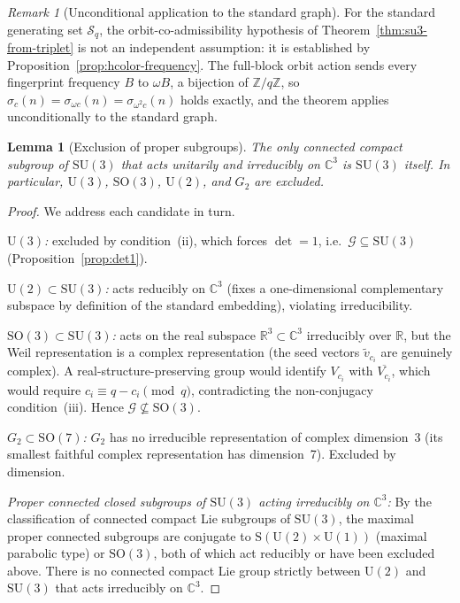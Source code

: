 \documentclass[11pt,a4paper]{article}
\newtheorem{lemma}[theorem]{Lemma}
\theoremstyle{definition}
\theoremstyle{remark}
\newtheorem{remark}[theorem]{Remark}
\newcommand{\SU}{\mathrm{SU}}
\newcommand{\Z}{\mathbb{Z}}
\newcommand{\C}{\mathbb{C}}
\newcommand{\R}{\mathbb{R}}
\newcommand{\Sq}{\mathcal{S}_q}
\begin{document}
      \begin{remark}[Unconditional application to the standard graph]
        \label{rmk:su3-unconditional}
        For the standard generating set $\Sq$, the orbit-co-admissibility hypothesis of
        Theorem~\ref{thm:su3-from-triplet} is not an independent assumption: it is established by
        Proposition~\ref{prop:hcolor-frequency}.
        The full-block orbit action sends every fingerprint frequency $B$ to $\omega B$, a bijection
        of $\Z/q\Z$, so $\sigma_c(n) = \sigma_{\omega c}(n) = \sigma_{\omega^2 c}(n)$ holds exactly,
        and the theorem applies unconditionally to the standard graph.
      \end{remark}

      \begin{lemma}[Exclusion of proper subgroups]
        \label{lem:exclusion}
        The only connected compact subgroup of $\SU(3)$ that acts unitarily and irreducibly on $\C^3$
        is $\SU(3)$ itself.
        In particular, $\mathrm{U}(3)$, $\mathrm{SO}(3)$, $\mathrm{U}(2)$, and $G_2$ are excluded.
      \end{lemma}

      \begin{proof}
        We address each candidate in turn.

        \emph{$\mathrm{U}(3)$:} excluded by condition~(ii), which forces $\det = 1$, i.e.\
        $\mathcal{G} \subseteq \mathrm{SU}(3)$ (Proposition~\ref{prop:det1}).

        \emph{$\mathrm{U}(2) \subset \SU(3)$:} acts reducibly on $\C^3$ (fixes a one-dimensional
        complementary subspace by definition of the standard embedding), violating irreducibility.

        \emph{$\mathrm{SO}(3) \subset \SU(3)$:} acts on the real subspace $\R^3 \subset \C^3$
        irreducibly over $\R$, but the Weil representation is a complex representation (the seed
        vectors $\tilde{v}_{c_i}$ are genuinely complex).
        A real-structure-preserving group would identify $V_{c_i}$ with $\overline{V_{c_i}}$, which
        would require $c_i \equiv q - c_i \pmod{q}$, contradicting the non-conjugacy condition~(iii).
        Hence $\mathcal{G} \not\subseteq \mathrm{SO}(3)$.

        \emph{$G_2 \subset \mathrm{SO}(7)$:} $G_2$ has no irreducible representation of complex
        dimension~3 (its smallest faithful complex representation has dimension~7).
        Excluded by dimension.

        \emph{Proper connected closed subgroups of $\SU(3)$ acting irreducibly on $\C^3$:}
        By the classification of connected compact Lie subgroups of $\SU(3)$, the maximal proper
        connected subgroups are conjugate to $\mathrm{S}(\mathrm{U}(2) \times \mathrm{U}(1))$
        (maximal parabolic type) or $\mathrm{SO}(3)$, both of which act reducibly or have been
        excluded above.
        There is no connected compact Lie group strictly between $\mathrm{U}(2)$ and $\SU(3)$ that
        acts irreducibly on $\C^3$.
      \end{proof}
\end{document}
